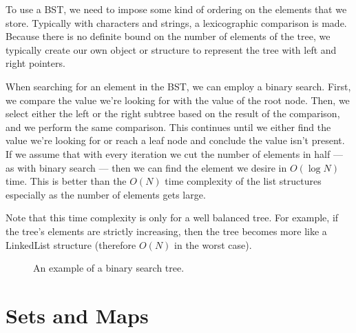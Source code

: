 To use a BST, we need to impose some kind of ordering on the elements that we store. Typically with characters and strings, a lexicographic comparison is made. Because there is no definite bound on the number of elements of the tree, we typically create our own object or structure to represent the tree with left and right pointers.

When searching for an element in the BST, we can employ a binary search. First, we compare the value we're looking for with the value of the root node. Then, we select either the left or the right subtree based on the result of the comparison, and we perform the same comparison. This continues until we either find the value we're looking for or reach a leaf node and conclude the value isn't present. If we assume that with every iteration we cut the number of elements in half --- as with binary search --- then we can find the element we desire in $O(\log{N})$ time. This is better than the $O(N)$ time complexity of the list structures especially as the number of elements gets large.

Note that this time complexity is only for a well balanced tree. For example, if the tree's elements are strictly increasing, then the tree becomes more like a LinkedList structure (therefore $O(N)$ in the worst case).


\begin{figure}
\centering
{}
\caption{An example of a binary search tree.}
\label{fig:tree2}
\end{figure}



\section{Sets and Maps}

